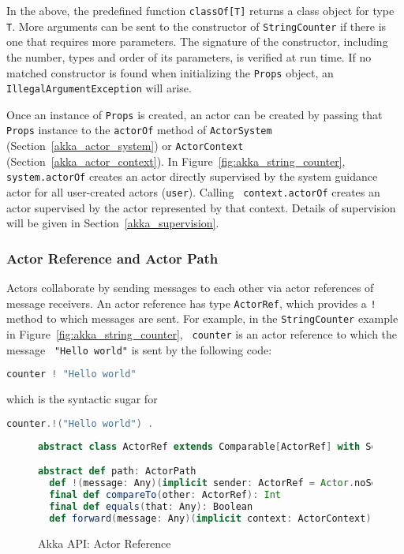 In the above, the predefined function {\tt classOf[T]} returns a class object 
for type {\tt T}.  More arguments can 
be sent to the constructor of {\tt StringCounter} if there is one that requires 
more parameters.   The signature of the constructor, including the number, 
types and order of  its parameters, is verified at run time.  If no matched 
constructor is  found when initializing the {\tt Props} object, an {\tt 
IllegalArgumentException} will arise.

Once an instance of {\tt Props} is created, an actor can be created by passing 
that {\tt Props} instance to the {\tt actorOf}  method of {\tt ActorSystem} (Section~\ref{akka_actor_system}) or 
{\tt ActorContext} (Section~\ref{akka_actor_context}). In Figure~\ref{fig:akka_string_counter},
{\tt  system.actorOf} creates an actor directly supervised by the system 
guidance actor  for all user-created actors ({\tt user}).  Calling {\tt 
context.actorOf} creates an actor supervised by the actor represented by that 
context. Details of supervision will be given in Section~\ref{akka_supervision}.

\subsubsection{Actor Reference and Actor Path}
\label{akka_actor_reference}

Actors collaborate by sending messages to each other via actor 
references of message receivers.  An actor reference has type {\tt ActorRef},
which provides a {\tt !} method to which messages are sent.  For example,
in the {\tt StringCounter} example in Figure~\ref{fig:akka_string_counter}, {\tt 
counter} is an actor reference to which the message \textcolor{mauve}{{\tt 
"Hello world"}} is sent by the following code:
\begin{lstlisting}[language=scala]
  counter ! "Hello world"
\end{lstlisting}
which is the syntactic sugar for 
\begin{lstlisting}[language=scala]
  counter.!("Hello world") .
\end{lstlisting}


\begin{figure}[h]
\begin{lstlisting}[language=scala]
abstract class ActorRef extends Comparable[ActorRef] with Serializable

abstract def path: ActorPath
  def !(message: Any)(implicit sender: ActorRef = Actor.noSender): Unit
  final def compareTo(other: ActorRef): Int
  final def equals(that: Any): Boolean
  def forward(message: Any)(implicit context: ActorContext): Unit

\end{lstlisting}
\caption{Akka API: Actor Reference}
\label{akka_actor_reference_api}
\end{figure}


